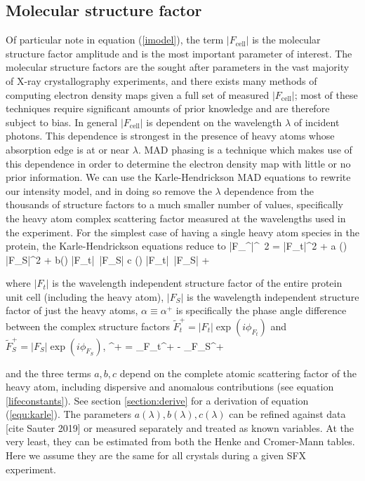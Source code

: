 \documentclass[dists.tex]{subfiles}
\begin{document}
\subsection{Molecular structure factor}
\noindent Of particular note in equation (\ref{imodel}), the term $|F_\text{cell}|$ is the molecular structure factor amplitude and is the most important parameter of interest.  The molecular structure factors are the sought after parameters in the vast majority of X-ray crystallography experiments, and there exists many methods of computing electron density maps given a full set of measured $|F_\text{cell}|$; most of these techniques require significant amounts of prior knowledge and are therefore subject to bias.  In general $|F_\text{cell}|$ is dependent on the wavelength $\lambda$ of incident photons. This dependence is strongest in the presence of heavy atoms whose absorption edge is at or near $\lambda$. MAD phasing is a technique which makes use of this dependence in order to determine the electron density map with little or no prior information. We can use the Karle-Hendrickson MAD equations to rewrite our intensity model, and in doing so remove the $\lambda$ dependence from the thousands of structure factors to a much smaller number of values, specifically  the heavy atom complex scattering factor measured at the wavelengths used in the experiment. For the simplest case of having a single heavy atom species in the protein, the Karle-Hendrickson equations reduce to  
\be \label{equ:karle}
|F_^{\pm}|^ {\,2} = |F_t|^2 + a (\lambda) |F_S|^2 + b(\lambda) |F_t|\, |F_S| \cos \alpha  \pm c (\lambda) |F_t|\, |F_S| \sin \alpha  + \epsilon
\ee

where $|F_t|$ is the wavelength independent structure factor of the entire protein unit cell (including the heavy atom),  $|F_S|$ is the wavelength independent structure factor of just the heavy atoms, $\alpha \equiv \alpha^+$ is specifically the phase angle difference between  the complex structure factors $\widetilde F_t^+ = |F_t| \exp (i\phi_{F_t})$ and $\widetilde F_S^+ = |F_S| \exp (i\phi_{F_S})$, 
\be
\alpha \equiv \alpha^+ = \phi_{F_t^+} - \phi_{F_S^+}
\ee

and the three terms $a,b,c$ depend on the complete atomic scattering factor of the heavy atom, including dispersive and anomalous contributions (see equation \ref{lifeconstants}). See section \ref{section:derive} for a derivation of equation (\ref{equ:karle}). The parameters $a(\lambda), b(\lambda), c(\lambda)$ can be refined against data [cite Sauter 2019] or measured separately and treated as known variables. At the very least, they can be estimated from both the Henke and Cromer-Mann tables. Here we assume they are the same for all crystals during a given SFX experiment. 
\end{document}

